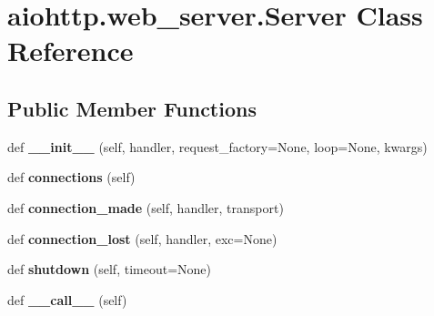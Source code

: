 \hypertarget{classaiohttp_1_1web__server_1_1_server}{}\section{aiohttp.\+web\+\_\+server.\+Server Class Reference}
\label{classaiohttp_1_1web__server_1_1_server}
\subsection*{Public Member Functions}
\begin{DoxyCompactItemize}
\item 
\mbox{\label{classaiohttp_1_1web__server_1_1_server_ad759fd967edbe6b1f3adef417db26633}} 
def {\bfseries \+\_\+\+\_\+init\+\_\+\+\_\+} (self, handler, request\+\_\+factory=None, loop=None, kwargs)
\item 
\mbox{\label{classaiohttp_1_1web__server_1_1_server_af80ad5e31a2e30ac3dab40d1ce94b702}} 
def {\bfseries connections} (self)
\item 
\mbox{\label{classaiohttp_1_1web__server_1_1_server_a2b1e940d29d054ecf1d5a0ab04b5c505}} 
def {\bfseries connection\+\_\+made} (self, handler, transport)
\item 
\mbox{\label{classaiohttp_1_1web__server_1_1_server_ac1d5e5da7f45f250b749c7bc717f61c5}} 
def {\bfseries connection\+\_\+lost} (self, handler, exc=None)
\item 
\mbox{\label{classaiohttp_1_1web__server_1_1_server_a183da6a1ffcfba31398ed489d381248d}} 
def {\bfseries shutdown} (self, timeout=None)
\item 
\mbox{\label{classaiohttp_1_1web__server_1_1_server_ac87ea68bc1bd94eafcb318908308217e}} 
def {\bfseries \+\_\+\+\_\+call\+\_\+\+\_\+} (self)
\end{DoxyCompactItemize}

